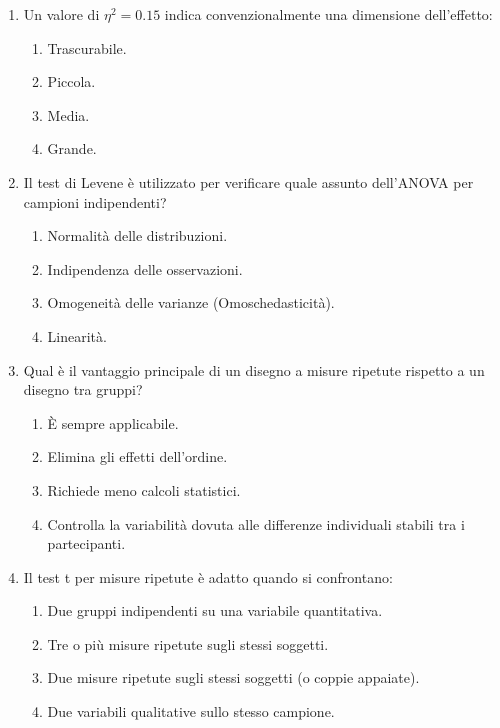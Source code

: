 \documentclass[12pt, a4paper]{article}
\newcommand{\etasq}{\eta^2} %
\begin{document}
\begin{enumerate}
    \item Un valore di $\etasq = 0.15$ indica convenzionalmente una dimensione dell'effetto:
    \begin{enumerate}
        \item Trascurabile.
        \item Piccola.
        \item Media.
        \item Grande.
    \end{enumerate}

    \item Il test di Levene è utilizzato per verificare quale assunto dell'ANOVA per campioni indipendenti?
    \begin{enumerate}
        \item Normalità delle distribuzioni.
        \item Indipendenza delle osservazioni.
        \item Omogeneità delle varianze (Omoschedasticità).
        \item Linearità.
    \end{enumerate}

    \item Qual è il vantaggio principale di un disegno a misure ripetute rispetto a un disegno tra gruppi?
    \begin{enumerate}
        \item È sempre applicabile.
        \item Elimina gli effetti dell'ordine.
        \item Richiede meno calcoli statistici.
        \item Controlla la variabilità dovuta alle differenze individuali stabili tra i partecipanti.
    \end{enumerate}

     \item Il test t per misure ripetute è adatto quando si confrontano:
    \begin{enumerate}
        \item Due gruppi indipendenti su una variabile quantitativa.
        \item Tre o più misure ripetute sugli stessi soggetti.
        \item Due misure ripetute sugli stessi soggetti (o coppie appaiate).
        \item Due variabili qualitative sullo stesso campione.
    \end{enumerate}


\end{enumerate}
\end{document}
